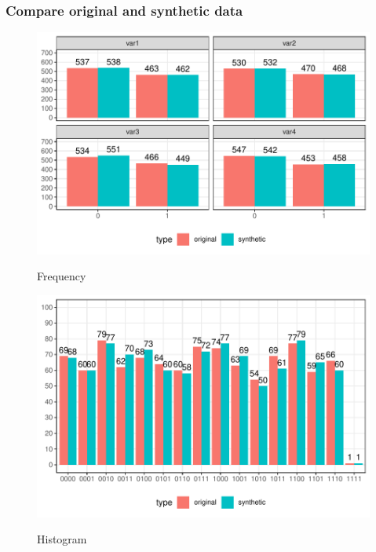 \documentclass[t,8pt,utfx8]{beamer}
\begin{document}
\begin{spacing}{1.25}
\begin{frame}[t]\frametitle{Compare original and synthetic data}
\begin{minipage}{0.48\textwidth}
    \begin{figure}
        \centering
        \caption{Frequency}
        \includegraphics[width=\textwidth]{../../graphs/graph_cart_frequency_compare.pdf}
        \label{fig:frequency_compare}
    \end{figure}
\end{minipage}
\hfill
\begin{minipage}{0.48\textwidth}
    \begin{figure}
        \centering
        \caption{Histogram}
        \includegraphics[width=\textwidth]{../../graphs/graph_cart_histogram_compare.pdf}
        \label{fig:histogram_compare}
    \end{figure}
\end{minipage}
\end{frame}


\end{spacing}
\end{document}
